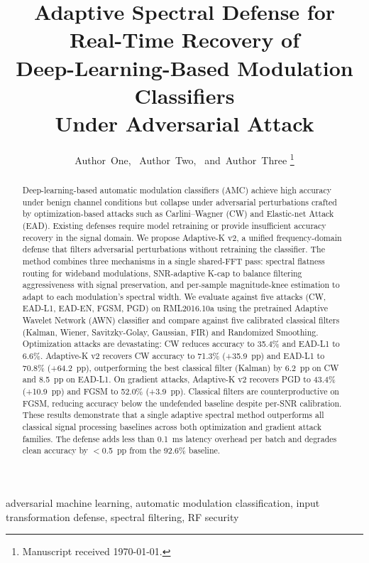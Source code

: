 \documentclass[journal]{IEEEtran}
\title{Adaptive Spectral Defense for Real-Time Recovery of\\
  Deep-Learning-Based Modulation Classifiers\\
  Under Adversarial Attack}
\author{%
  Author~One,~\IEEEmembership{Member,~IEEE,}
  Author~Two,~\IEEEmembership{Member,~IEEE,}
  and~Author~Three%
  \thanks{Manuscript received \today.}%
}
\begin{document}
\maketitle

\begin{abstract}
Deep-learning-based automatic modulation classifiers (AMC) achieve high
accuracy under benign channel conditions but collapse under adversarial
perturbations crafted by optimization-based attacks such as Carlini--Wagner
(CW) and Elastic-net Attack (EAD).  Existing defenses require model
retraining or provide insufficient accuracy recovery in the signal domain.
We propose Adaptive-K v2, a unified frequency-domain defense that filters
adversarial perturbations without retraining the classifier.  The method
combines three mechanisms in a single shared-FFT pass: spectral flatness
routing for wideband modulations, SNR-adaptive K-cap to balance filtering
aggressiveness with signal preservation, and per-sample magnitude-knee
estimation to adapt to each modulation's spectral width.
We evaluate against five attacks (CW, EAD-L1, EAD-EN, FGSM, PGD) on
RML2016.10a using the pretrained Adaptive Wavelet Network (AWN) classifier
and compare against five calibrated classical filters (Kalman, Wiener,
Savitzky-Golay, Gaussian, FIR) and Randomized Smoothing.
Optimization attacks are devastating: CW reduces accuracy to 35.4\% and
EAD-L1 to 6.6\%.  Adaptive-K v2 recovers CW accuracy to 71.3\%
(+35.9~pp) and EAD-L1 to 70.8\% (+64.2~pp), outperforming the best
classical filter (Kalman) by 6.2~pp on CW and 8.5~pp on EAD-L1.
On gradient attacks, Adaptive-K v2 recovers PGD to 43.4\% (+10.9~pp)
and FGSM to 52.0\% (+3.9~pp).  Classical filters are counterproductive
on FGSM, reducing accuracy below the undefended baseline despite
per-SNR calibration.  These results demonstrate that a single adaptive
spectral method outperforms all classical signal processing baselines
across both optimization and gradient attack families.
The defense adds less than 0.1~ms latency overhead per batch and degrades
clean accuracy by $<$0.5~pp from the 92.6\% baseline.
\end{abstract}

\begin{IEEEkeywords}
adversarial machine learning, automatic modulation classification,
input transformation defense, spectral filtering, RF security
\end{IEEEkeywords}











\end{document}
